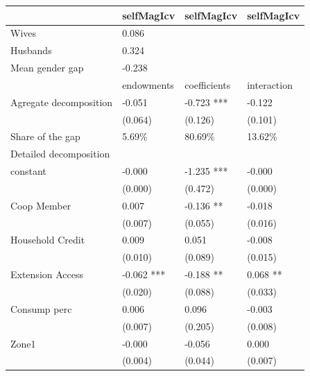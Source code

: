 \begin{tabular}{llll}
\toprule
{} &  selfMagIcv &    selfMagIcv &   selfMagIcv \\
\midrule
Wives                                &       0.086 &               &              \\
Husbands                             &       0.324 &               &              \\
Mean gender gap                      &      -0.238 &               &              \\
                                     &  endowments &  coefficients &  interaction \\
Agregate decomposition               &      -0.051 &    -0.723 *** &       -0.122 \\
                                     &     (0.064) &       (0.126) &      (0.101) \\
Share of the gap                     &      5.69\% &       80.69\% &      13.62\% \\
Detailed decomposition               &             &               &              \\
constant                             &      -0.000 &    -1.235 *** &       -0.000 \\
                                     &     (0.000) &       (0.472) &      (0.000) \\
Coop Member                          &       0.007 &     -0.136 ** &       -0.018 \\
                                     &     (0.007) &       (0.055) &      (0.016) \\
Household Credit                     &       0.009 &         0.051 &       -0.008 \\
                                     &     (0.010) &       (0.089) &      (0.015) \\
Extension Access                     &  -0.062 *** &     -0.188 ** &     0.068 ** \\
                                     &     (0.020) &       (0.088) &      (0.033) \\
Consump perc                         &       0.006 &         0.096 &       -0.003 \\
                                     &     (0.007) &       (0.205) &      (0.008) \\
Zone1                                &      -0.000 &        -0.056 &        0.000 \\
                                     &     (0.004) &       (0.044) &      (0.007) \\

\end{tabular}
